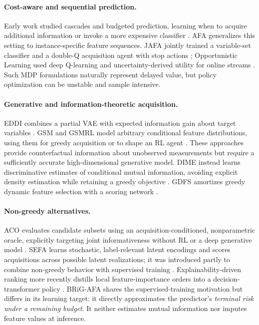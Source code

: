 \documentclass[10pt]{article}
\newcommand{\method}{BRiG-AFA}
\begin{document}
\paragraph{Cost-aware and sequential prediction.}
Early work studied cascades and budgeted prediction, learning when to acquire additional information or invoke a more expensive classifier \citep{trapeznikov2013budget,pu2017acquire}. AFA generalizes this setting to instance-specific feature sequences. JAFA jointly trained a variable-set classifier and a double-Q acquisition agent with stop actions \citep{shim2018jafa}; Opportunistic Learning used deep Q-learning and uncertainty-derived utility for online streams \citep{kachuee2019opportunistic}. Such MDP formulations naturally represent delayed value, but policy optimization can be unstable and sample intensive.

\paragraph{Generative and information-theoretic acquisition.}
EDDI combines a partial VAE with expected information gain about target variables \citep{ma2019eddi}. GSM and GSMRL model arbitrary conditional feature distributions, using them for greedy acquisition or to shape an RL agent \citep{li2021gsm}. These approaches provide counterfactual information about unobserved measurements but require a sufficiently accurate high-dimensional generative model. DIME instead learns discriminative estimates of conditional mutual information, avoiding explicit density estimation while retaining a greedy objective \citep{gadgil2024dime}. GDFS amortizes greedy dynamic feature selection with a scoring network \citep{covert2023gdfs}.

\paragraph{Non-greedy alternatives.}
ACO evaluates candidate subsets using an acquisition-conditioned, nonparametric oracle, explicitly targeting joint informativeness without RL or a deep generative model \citep{valancius2024aco}. SEFA learns stochastic, label-relevant latent encodings and scores acquisitions across possible latent realizations; it was introduced partly to combine non-greedy behavior with supervised training \citep{norcliffe2025sefa}. Explainability-driven ranking more recently distills local feature-importance orders into a decision-transformer policy \citep{guney2025explainability}. \method{} shares the supervised-training motivation but differs in its learning target: it directly approximates the predictor's \emph{terminal risk under a remaining budget}. It neither estimates mutual information nor imputes feature values at inference.
\end{document}
